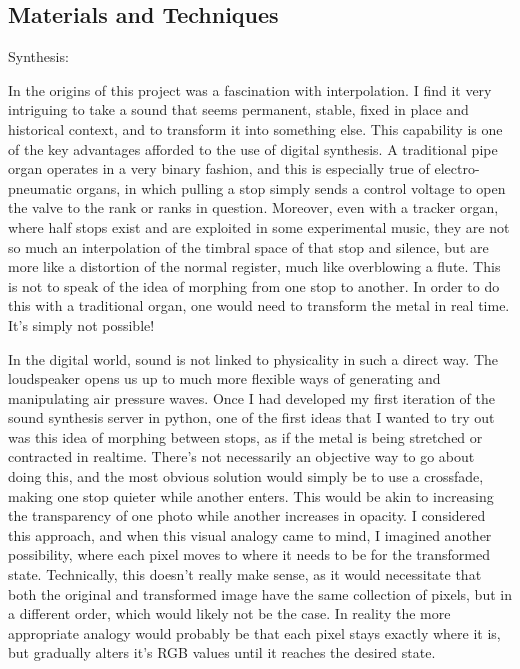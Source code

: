 \documentclass[12pt,twoside,maitrise]{dms_ks}
\theoremstyle{definition}
\begin{document}
\subsection{Materials and Techniques}

Synthesis:

In the origins of this project was a fascination with interpolation.
I find it very intriguing to take a sound that seems permanent, stable, fixed in place and historical context, and to transform it into something else.
This capability is one of the key advantages afforded to the use of digital synthesis.
A traditional pipe organ operates in a very binary fashion, and this is especially true of electro-pneumatic organs, in which pulling a stop simply sends a control voltage to open the valve to the rank or ranks in question.
Moreover, even with a tracker organ, where half stops exist and are exploited in some experimental music, they are not so much an interpolation of the timbral space of that stop and silence, but are more like a distortion of the normal register, much like overblowing a flute.
This is not to speak of the idea of morphing from one stop to another.
In order to do this with a traditional organ, one would need to transform the metal in real time.
It's simply not possible!

In the digital world, sound is not linked to physicality in such a direct way.
The loudspeaker opens us up to much more flexible ways of generating and manipulating air pressure waves.
Once I had developed my first iteration of the sound synthesis server in python, one of the first ideas that I wanted to try out was this idea of morphing between stops, as if the metal is being stretched or contracted in realtime.
There's not necessarily an objective way to go about doing this, and the most obvious solution would simply be to use a crossfade, making one stop quieter while another enters.
This would be akin to increasing the transparency of one photo while another increases in opacity.
I considered this approach, and when this visual analogy came to mind, I imagined another possibility, where each pixel moves to where it needs to be for the transformed state.
Technically, this doesn't really make sense, as it would necessitate that both the original and transformed image have the same collection of pixels, but in a different order, which would likely not be the case.
In reality the more appropriate analogy would probably be that each pixel stays exactly where it is, but gradually alters it's RGB values until it reaches the desired state.
\end{document}
